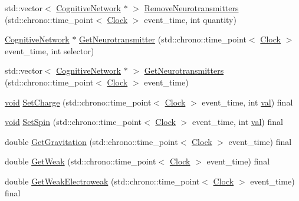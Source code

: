 \begin{DoxyCompactItemize}
\item 
std\+::vector$<$ \mbox{\hyperlink{class_cognitive_network}{Cognitive\+Network}} $\ast$ $>$ \mbox{\hyperlink{class_cognitive_network_a5e706084296ce84ff6884c1506213b03}{Remove\+Neurotransmitters}} (std\+::chrono\+::time\+\_\+point$<$ \mbox{\hyperlink{universe_8h_a0ef8d951d1ca5ab3cfaf7ab4c7a6fd80}{Clock}} $>$ event\+\_\+time, int quantity)
\item 
\mbox{\hyperlink{class_cognitive_network}{Cognitive\+Network}} $\ast$ \mbox{\hyperlink{class_cognitive_network_a85890c201376061b1ffbe8fdfc1a8633}{Get\+Neurotransmitter}} (std\+::chrono\+::time\+\_\+point$<$ \mbox{\hyperlink{universe_8h_a0ef8d951d1ca5ab3cfaf7ab4c7a6fd80}{Clock}} $>$ event\+\_\+time, int selector)
\item 
std\+::vector$<$ \mbox{\hyperlink{class_cognitive_network}{Cognitive\+Network}} $\ast$ $>$ \mbox{\hyperlink{class_cognitive_network_ac56b1585864b372c8897dcb5720d00a7}{Get\+Neurotransmitters}} (std\+::chrono\+::time\+\_\+point$<$ \mbox{\hyperlink{universe_8h_a0ef8d951d1ca5ab3cfaf7ab4c7a6fd80}{Clock}} $>$ event\+\_\+time)
\item 
\mbox{\hyperlink{glad_8h_a950fc91edb4504f62f1c577bf4727c29}{void}} \mbox{\hyperlink{class_cognitive_network_a99f801aeca299186cc706696696749b1}{Set\+Charge}} (std\+::chrono\+::time\+\_\+point$<$ \mbox{\hyperlink{universe_8h_a0ef8d951d1ca5ab3cfaf7ab4c7a6fd80}{Clock}} $>$ event\+\_\+time, int \mbox{\hyperlink{glad_8h_a26942fd2ed566ef553eae82d2c109c8f}{val}}) final
\item 
\mbox{\hyperlink{glad_8h_a950fc91edb4504f62f1c577bf4727c29}{void}} \mbox{\hyperlink{class_cognitive_network_a3fc6d08413bfd4350f94d6f2627eedc7}{Set\+Spin}} (std\+::chrono\+::time\+\_\+point$<$ \mbox{\hyperlink{universe_8h_a0ef8d951d1ca5ab3cfaf7ab4c7a6fd80}{Clock}} $>$ event\+\_\+time, int \mbox{\hyperlink{glad_8h_a26942fd2ed566ef553eae82d2c109c8f}{val}}) final
\item 
double \mbox{\hyperlink{class_cognitive_network_a4b5150310288c52f00ecb745ae9e7f86}{Get\+Gravitation}} (std\+::chrono\+::time\+\_\+point$<$ \mbox{\hyperlink{universe_8h_a0ef8d951d1ca5ab3cfaf7ab4c7a6fd80}{Clock}} $>$ event\+\_\+time) final
\item 
double \mbox{\hyperlink{class_cognitive_network_a761db75ac8eab7b4625e5a398891bd12}{Get\+Weak}} (std\+::chrono\+::time\+\_\+point$<$ \mbox{\hyperlink{universe_8h_a0ef8d951d1ca5ab3cfaf7ab4c7a6fd80}{Clock}} $>$ event\+\_\+time) final
\item 
double \mbox{\hyperlink{class_cognitive_network_aa6342c390fe8e7c648b4c6bc8f93ba4a}{Get\+Weak\+Electroweak}} (std\+::chrono\+::time\+\_\+point$<$ \mbox{\hyperlink{universe_8h_a0ef8d951d1ca5ab3cfaf7ab4c7a6fd80}{Clock}} $>$ event\+\_\+time) final

\end{DoxyCompactItemize}
